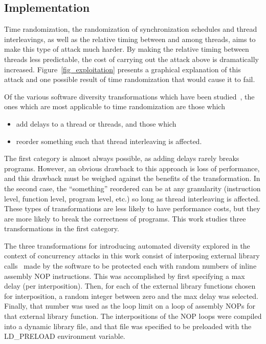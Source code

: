\subsection{Implementation}\label{implementation}
Time randomization, the randomization of synchronization schedules and thread interleavings, as well as the relative timing between and among threads, aims to make this type of attack much harder.
By making the relative timing between threads less predictable, the cost of carrying out the attack above is dramatically increased.
Figure~\ref{fig_exploitation} presents a graphical explanation of this attack and one possible result of time randomization that would cause it to fail.

Of the various software diversity transformations which have been studied~\cite{Larsen2014}, the ones which are most applicable to time randomization are those which
\begin{itemize}\addtolength{\itemsep}{-.35\baselineskip}
	\item add delays to a thread or threads, and those which
	\item reorder something such that thread interleaving is affected.
\end{itemize}
The first category is almost always possible, as adding delays rarely breaks programs.
However, an obvious drawback to this approach is loss of performance, and this drawback must be weighed against the benefits of the transformation.
In the second case, the ``something'' reordered can be at any granularity (instruction level, function level, program level, etc.) so long as thread interleaving is affected.
These types of transformations are less likely to have performance costs, but they are more likely to break the correctness of programs.
This work studies three transformations in the first category.

The three transformations for introducing automated diversity explored in the context of concurrency attacks in this work consist of interposing external library calls~\cite{Conrad2009} made by the software to be protected each with random numbers of inline assembly NOP instructions.
This was accomplished by first specifying a max delay (per interposition).
Then, for each of the external library functions chosen for interposition, a random integer between zero and the max delay was selected.
Finally, that number was used as the loop limit on a loop of assembly NOPs for that external library function.
The interpositions of the NOP loops were compiled into a dynamic library file, and that file was specified to be preloaded with the LD\_PRELOAD environment variable.

